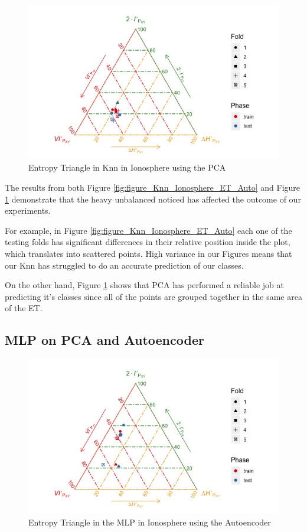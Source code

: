 \documentclass[12pt]{report}
\begin{document}
\begin{figure}[H]
	\centering
	\includegraphics[width=1\linewidth]{Figuras_tfg/ET_knn_Ionosphere_pca}
	\caption{Entropy Triangle in Knn in Ionosphere using the PCA}
	\label{fig:figure_Knn_Ionosphere_ET_PCA}
\end{figure}

The results from both Figure \ref{fig:figure_Knn_Ionosphere_ET_Auto} and Figure \ref{fig:figure_Knn_Ionosphere_ET_PCA} demonstrate that the heavy unbalanced noticed has affected the outcome of our experiments.\par
For example, in Figure \ref{fig:figure_Knn_Ionosphere_ET_Auto} each one of the testing folds has significant differences in their relative position inside the plot, which translates into scattered points. High variance in our Figures means that our Knn has struggled to do an accurate prediction of our classes.

On the other hand, Figure \ref{fig:figure_Knn_Ionosphere_ET_PCA} shows that PCA has performed a reliable job at predicting it's classes since all of the points are grouped together in the same area of the ET.

\subsection{MLP on PCA and Autoencoder}

\begin{figure}[H]
	\centering
	\includegraphics[width=1\linewidth]{Figuras_tfg/ET_mlp_Ionosphere_auto}
	\caption{Entropy Triangle in the MLP in Ionosphere using the Autoencoder}
	\label{fig:figure_MLP_Ionosphere_ET_Auto}
\end{figure}
\end{document}
